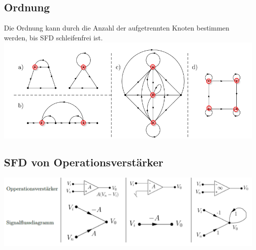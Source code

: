 \subsection{Ordnung}
Die Ordnung kann durch die Anzahl der aufgetrennten Knoten bestimmen werden, bis SFD schleifenfrei ist.\\
\includegraphics[width=\columnwidth]{Images/sfd_ordnung}


\subsection{SFD von Operationsverstärker}
\includegraphics[width=\columnwidth]{"./Images/sfd_op"}
